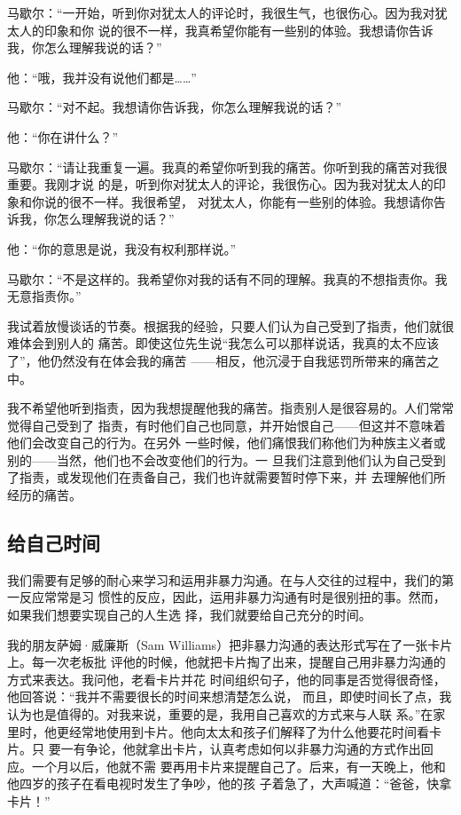 \documentclass{ctexart}
\begin{document}
马歇尔：``一开始，听到你对犹太人的评论时，我很生气，也很伤心。因为我对犹太人的印象和你
说的很不一样，我真希望你能有一些别的体验。我想请你告诉我，你怎么理解我说的话？''

他：``哦，我并没有说他们都是\ldots\ldots''

马歇尔：``对不起。我想请你告诉我，你怎么理解我说的话？''

他：``你在讲什么？''

马歇尔：``请让我重复一遍。我真的希望你听到我的痛苦。你听到我的痛苦对我很重要。我刚才说
的是，听到你对犹太人的评论，我很伤心。因为我对犹太人的印象和你说的很不一样。我很希望，
对犹太人，你能有一些别的体验。我想请你告诉我，你怎么理解我说的话？''

他：``你的意思是说，我没有权利那样说。''

马歇尔：``不是这样的。我希望你对我的话有不同的理解。我真的不想指责你。我无意指责你。''

我试着放慢谈话的节奏。根据我的经验，只要人们认为自己受到了指责，他们就很难体会到别人的
痛苦。即使这位先生说``我怎么可以那样说话，我真的太不应该了''，他仍然没有在体会我的痛苦
------相反，他沉浸于自我惩罚所带来的痛苦之中。

我不希望他听到指责，因为我想提醒他我的痛苦。指责别人是很容易的。人们常常觉得自己受到了
指责，有时他们自己也同意，并开始恨自己------但这并不意味着他们会改变自己的行为。在另外
一些时候，他们痛恨我们称他们为种族主义者或别的------当然，他们也不会改变他们的行为。一
旦我们注意到他们认为自己受到了指责，或发现他们在责备自己，我们也许就需要暂时停下来，并
去理解他们所经历的痛苦。


\subsection{给自己时间}

我们需要有足够的耐心来学习和运用非暴力沟通。在与人交往的过程中，我们的第一反应常常是习
惯性的反应，因此，运用非暴力沟通有时是很别扭的事。然而，如果我们想要实现自己的人生选
择，我们就要给自己充分的时间。

我的朋友萨姆·威廉斯（Sam Williams）把非暴力沟通的表达形式写在了一张卡片上。每一次老板批
评他的时候，他就把卡片掏了出来，提醒自己用非暴力沟通的方式来表达。我问他，老看卡片并花
时间组织句子，他的同事是否觉得很奇怪，他回答说：``我并不需要很长的时间来想清楚怎么说，
而且，即使时间长了点，我认为也是值得的。对我来说，重要的是，我用自己喜欢的方式来与人联
系。''在家里时，他更经常地使用到卡片。他向太太和孩子们解释了为什么他要花时间看卡片。只
要一有争论，他就拿出卡片，认真考虑如何以非暴力沟通的方式作出回应。一个月以后，他就不需
要再用卡片来提醒自己了。后来，有一天晚上，他和他四岁的孩子在看电视时发生了争吵，他的孩
子着急了，大声喊道：``爸爸，快拿卡片！''
\end{document}
